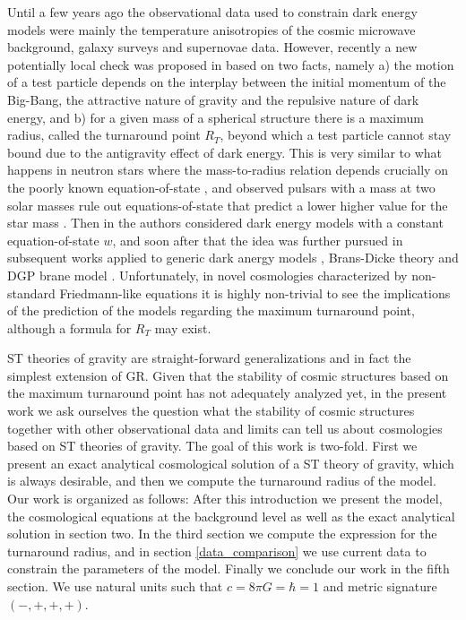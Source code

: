 Until a few years ago the observational data used to constrain dark energy models were mainly the temperature anisotropies of the cosmic microwave background, galaxy surveys and supernovae data. However, recently a new potentially local check was proposed in \cite{tomaras} based on two facts, namely a) the motion of a test particle depends on the interplay between the initial momentum of the Big-Bang, the attractive nature of gravity and the repulsive nature of dark energy, and b) for a given mass of a spherical structure there is a maximum radius, called the turnaround point $R_T$, beyond which a test particle cannot stay bound due to the antigravity effect of dark energy. This is very similar to what happens in neutron stars where the mass-to-radius relation depends crucially on the poorly known equation-of-state \cite{eos}, and observed pulsars with a mass at two solar masses rule out equations-of-state that predict a lower higher value for the star mass \cite{shapiro}. Then in \cite{tomaras1} the authors considered dark energy models with a constant equation-of-state $w$, and soon after that the idea was further pursued in subsequent works applied to generic dark anergy models \cite{tomaras2}, Brans-Dicke theory \cite{tomaras3} and DGP brane model \cite{kousvos}. Unfortunately, in novel cosmologies characterized by non-standard Friedmann-like equations it is highly non-trivial to see the implications of the prediction of the models regarding the maximum turnaround point, although a formula for $R_T$ may exist.

ST theories of gravity are straight-forward generalizations and in fact the simplest extension of GR. Given that the stability of cosmic structures based on the maximum turnaround point has not adequately analyzed yet, in the present work we ask ourselves the question what the stability of cosmic structures together with other observational data and limits can tell us about cosmologies based on ST theories of gravity. The goal of this work is two-fold. First we present an exact analytical cosmological solution of a ST theory of gravity, which is always desirable,
and then we compute the turnaround radius of the model. Our work is organized as follows: After this introduction we present the model, the cosmological equations at the background level as well as the exact analytical solution in section two. In the third section we compute the expression for the turnaround radius, and in section \ref{data_comparison} we use current data to constrain the parameters of the model. Finally we conclude our work in the fifth section. We use natural units such that $c = 8 \pi G = \hbar = 1$ and metric signature $(-, +, +,+)$. 

